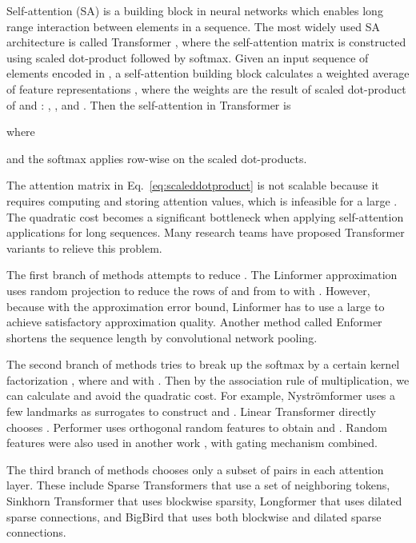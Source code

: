\documentclass{article}
\begin{document}
Self-attention (SA) is a building block in neural networks which enables long range interaction between elements in a sequence. The most widely used SA architecture is called Transformer \cite{vaswani2017attention}, where the self-attention matrix is constructed using scaled dot-product followed by softmax. Given an input sequence of  elements encoded in , a self-attention building block calculates a weighted average of feature representations , where the weights are the result of scaled dot-product of  and : , , and .
Then the self-attention in Transformer is

where 

and the softmax applies row-wise on the scaled dot-products.

The attention matrix in Eq.~\ref{eq:scaleddotproduct} is not scalable because it requires computing and storing  attention values, which is infeasible for a large . The quadratic cost becomes a significant bottleneck when applying self-attention applications for long sequences. Many research teams have proposed Transformer variants to relieve this problem.

The first branch of methods attempts to reduce .
The Linformer approximation \cite{wang2020linformer} uses random projection to reduce the rows of  and  from  to  with . However, because  with  the approximation error bound, Linformer has to use a large  to achieve satisfactory approximation quality.
Another method called Enformer \cite{enformer} shortens the sequence length by convolutional network pooling.

The second branch of methods tries to break up the softmax by a certain kernel factorization , where  and  with . Then by the association rule of multiplication, we can calculate  and avoid the quadratic cost. For example, Nystr\"omformer \cite{nystromformer} uses a few landmarks as surrogates to construct  and . Linear Transformer \cite{katharopoulos2020transformers} directly chooses . Performer \cite{performer} uses  orthogonal random features to obtain  and . Random features were also used in another work \cite{peng2021random}, with gating mechanism combined.

The third branch of methods chooses only a subset of  pairs in each attention layer. These include Sparse Transformers \cite{child2019generating,ainslie2020etc} that use a set of neighboring tokens, Sinkhorn Transformer \cite{tay2019lightweight} that uses blockwise sparsity, Longformer \cite{beltagy2020longformer} that uses dilated sparse connections, and BigBird \cite{zaheer2020big} that uses both blockwise and dilated sparse connections. 
\end{document}

